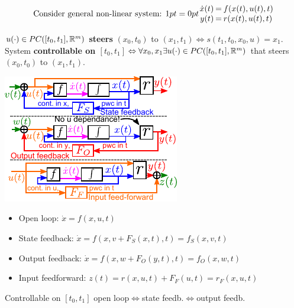 \vspace{-2mm}
\begin{equation}\label{eq:gen_non_lin_sys}
\text{Consider general non-linear system: }
\arraycolsep=0pt
\begin{array}{rcl}
\dot x(t) & = & f(x(t),u(t),t) \\
y(t) & = & r(x(t),u(t),t)
\end{array}
\end{equation}
\begin{Definition}
$u(\cdot)\in PC([t_0,t_1],\mathbb R^m)$ \textbf{steers} $(x_0,t_0)$ to $(x_1,t_1)\Leftrightarrow s(t_1,t_0,x_0,u)=x_1$. System \textbf{controllable on $[t_0,t_1]$}$\Leftrightarrow\forall x_0,x_1\exists u(\cdot)\in PC([t_0,t_1],\mathbb R^m)$ that steers $(x_0,t_0)$ to $(x_1,t_1)$.
\end{Definition}
\begin{minipage}{0.5\columnwidth}
\includegraphics[width=1\columnwidth]{figures/state_output_feedback.pdf}
\end{minipage}%
\begin{minipage}{0.5\columnwidth}
\begin{itemize}[leftmargin=4mm]
  \item Open loop: $\dot x=f(x,u,t)$
  \item State feedback: $\dot x=f(x,v+F_S(x,t),t)=f_S(x,v,t)$
  \item Output feedback: $\dot x=f(x,w+F_O(y,t),t)=f_O(x,w,t)$
  \item Input feedforward: $z(t)=r(x,u,t)+F_F(u,t)=r_F(x,u,t)$
\end{itemize}
\begin{Theorem}
Controllable on $[t_0,t_1]$ open loop$\Leftrightarrow$state feedb.$\Leftrightarrow$output feedb.
\end{Theorem}
\end{minipage}
